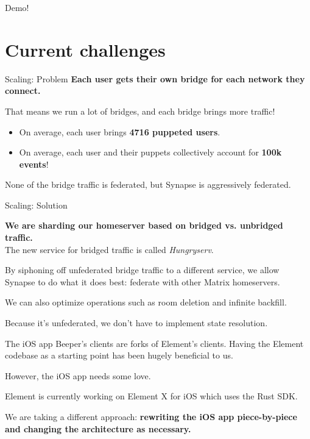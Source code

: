 \documentclass{beeper}
\begin{document}
\begingroup
\def\insertframenumber{\relax}
\begin{frame}[standout]
    \Large
    Demo!
\end{frame}
\endgroup

\section{Current challenges}

\begin{frame}{Scaling: Problem}
    \textbf{Each user gets their own bridge for each network they connect.}

    That means we run a lot of bridges, and each bridge brings more traffic!
    \pause

    \begin{itemize}
        \item On average, each user brings \textbf{4716 puppeted users}.
        \item On average, each user and their puppets collectively account for
            \textbf{100k events}!
    \end{itemize}

    \pause
    None of the bridge traffic is federated, but Synapse is aggressively
    federated.
\end{frame}

\begin{frame}{Scaling: Solution}
    \begin{center}
        \textbf{We are sharding our homeserver based on bridged vs. unbridged
        traffic.} \\
        The new service for bridged traffic is called \textit{Hungryserv}.
    \end{center}
    \vspace{1cm}
    \pause

    By siphoning off unfederated bridge traffic to a different service, we allow
    Synapse to do what it does best: federate with other Matrix homeservers.
    \pause

    We can also optimize operations such as room deletion and infinite backfill.

    Because it's unfederated, we don't have to implement state resolution.
\end{frame}

\begin{frame}{The iOS app}
    Beeper's clients are forks of Element's clients. Having the Element
    codebase as a starting point has been hugely beneficial to us.
    \pause

    However, the iOS app needs some love.
    \vspace{1cm}
    \pause

    Element is currently working on Element X for iOS which uses the Rust SDK.

    We are taking a different approach: \textbf{rewriting the iOS app
    piece-by-piece and changing the architecture as necessary.}
\end{frame}
\end{document}
